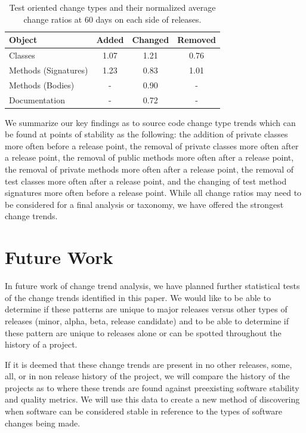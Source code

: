 \documentclass[conference]{IEEEtran}
\begin{document}
\begin{table}[h]
\begin{center}
\begin{tabular}{| l | c | c | c |}
\hline
Object & Added & Changed & Removed\\
\hline
Classes & 1.07 & 1.21 & 0.76 \\
Methods (Signatures) & 1.23 & 0.83 & 1.01 \\
Methods (Bodies) & - & 0.90 & - \\
Documentation & - & 0.72 & - \\
\hline
\end{tabular}
\end{center}
\caption{Test oriented change types and their normalized average change ratios at 60 days on each side of releases. \label{tab:test}}
\end{table}

We summarize our key findings as to source code change type trends which can be found at points of stability as the following: the addition of private classes more often
before a release point, the removal of private classes more often after a release point, the removal of public methods more often after a release point, 
the removal of private methods more often after a release point, the removal of test classes more often after a release point, and the changing of test method
signatures more often before a release point. While all change ratios may need to be considered for a final analysis or taxonomy, we have offered the strongest
change trends.

\section{Future Work}

In future work of change trend analysis, we have planned further statistical tests of the change trends identified in this paper. We would like to
be able to determine if these patterns are unique to major releases versus other types of releases (minor, alpha, beta, release candidate) and to
be able to determine if these pattern are unique to releases alone or can be spotted throughout the history of a project.

If it is deemed that these change trends are present in no other releases, some, all, or in non release history of the project, we will
compare the history of the projects as to where these trends are found against preexisting software stability and quality metrics. We will use this data to
create a new method of discovering when software can be considered stable in reference to the types of software changes being made. 
\end{document}
